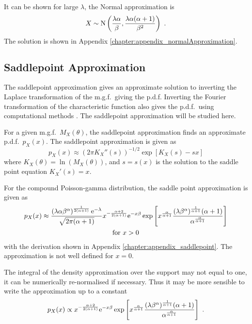 It can be shown for large $\lambda$, the Normal approximation is
\begin{equation}
  X\sim\operatorname{N}\left(\frac{\lambda\alpha}{\beta},\frac{\lambda\alpha(\alpha+1)}{\beta^2}\right) \ .
\end{equation}
The solution is shown in Appendix \ref{chapter:appendix_normalApproximation}.

\subsection{Saddlepoint Approximation}

The saddlepoint approximation \citep{daniels1954saddlepoint} gives an approximate solution to inverting the Laplace transformation of the m.g.f.~giving the p.d.f. Inverting the Fourier transformation of the characteristic function also gives the p.d.f.~using computational methods \citep{dunn2008evaluation}. The saddlepoint approximation will be studied here.

For a given m.g.f.~$M_X(\theta)$, the saddlepoint approximation \citep{daniels1954saddlepoint, butler2007saddlepoint} finds an approximate p.d.f.~$p_X(x)$. The saddlepoint approximation is given as
\begin{equation}
  p_X(x)\approx\left(2\pi K_X''(s)\right)^{-1/2}\exp\left[K_X(s)-sx\right]
  \label{eq:saddlePoint:generalSaddlePoint}
\end{equation}
where $K_X(\theta) = \ln\left(M_X(\theta)\right)$, and $s=s(x)$ is the solution to the saddle point equation $K_X'(s)=x$.

For the compound Poisson-gamma distribution, the saddle point approximation is given as 
\begin{multline}
  p_X(x)\approx
  \frac{\left(\lambda\alpha\beta^\alpha\right)^{\frac{1}{2(\alpha+1)}}\mathrm{e}^{-\lambda}}{\sqrt{2\pi(\alpha+1)}}x^{-\frac{\alpha+2}{2(\alpha+1)}}
  \mathrm{e}^{-x\beta}
  \exp\left[x^{\frac{\alpha}{\alpha+1}}
    \frac{(\lambda\beta^\alpha)^{\frac{1}{\alpha+1}}(\alpha+1)}{\alpha^{\frac{\alpha}{\alpha+1}}}
  \right]
  \\
  \text{for }x>0
  \label{eq:saddle_point_approx}
\end{multline}
with the derivation shown in Appendix \ref{chapter:appendix_saddlepoint}. The approximation is not well defined for $x=0$.

The integral of the density approximation over the support may not equal to one, it can be numerically re-normalised if necessary. Thus it may be more sensible to write the approximation up to a constant
\begin{equation}
  p_X(x)\propto x^{-\frac{\alpha+2}{2(\alpha+1)}}\mathrm{e}^{-x\beta}
  \exp\left[
    x^{\frac{\alpha}{\alpha+1}}
    \frac{
      (\lambda\beta^\alpha)^{\frac{1}{\alpha+1}}(\alpha+1)
    }
    {
      \alpha^{\frac{\alpha}{\alpha+1}}
    }
  \right]
  \ .
\end{equation}


